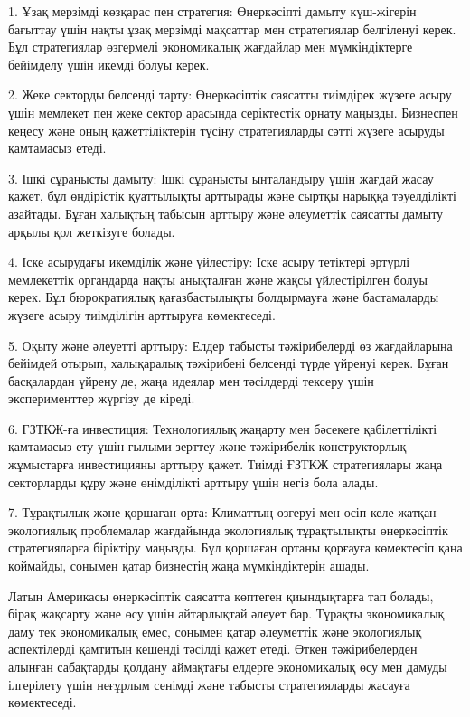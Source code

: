 \begin{multicols}{2}
1. Ұзақ мерзімді көзқарас пен стратегия: Өнеркәсіпті дамыту күш-жігерін
бағыттау үшін нақты ұзақ мерзімді мақсаттар мен стратегиялар белгіленуі
керек. Бұл стратегиялар өзгермелі экономикалық жағдайлар мен
мүмкіндіктерге бейімделу үшін икемді болуы керек.

2. Жеке секторды белсенді тарту: Өнеркәсіптік саясатты тиімдірек жүзеге
асыру үшін мемлекет пен жеке сектор арасында серіктестік орнату маңызды.
Бизнеспен кеңесу және оның қажеттіліктерін түсіну стратегияларды сәтті
жүзеге асыруды қамтамасыз етеді.

3. Ішкі сұранысты дамыту: Ішкі сұранысты ынталандыру үшін жағдай жасау
қажет, бұл өндірістік қуаттылықты арттырады және сыртқы нарыққа
тәуелділікті азайтады. Бұған халықтың табысын арттыру және әлеуметтік
саясатты дамыту арқылы қол жеткізуге болады.

4. Іске асырудағы икемділік және үйлестіру: Іске асыру тетіктері әртүрлі
мемлекеттік органдарда нақты анықталған және жақсы үйлестірілген болуы
керек. Бұл бюрократиялық қағазбастылықты болдырмауға және бастамаларды
жүзеге асыру тиімділігін арттыруға көмектеседі.

5. Оқыту және әлеуетті арттыру: Елдер табысты тәжірибелерді өз
жағдайларына бейімдей отырып, халықаралық тәжірибені белсенді түрде
үйренуі керек. Бұған басқалардан үйрену де, жаңа идеялар мен тәсілдерді
тексеру үшін эксперименттер жүргізу де кіреді.

6. ҒЗТКЖ-ға инвестиция: Технологиялық жаңарту мен бәсекеге
қабілеттілікті қамтамасыз ету үшін ғылыми-зерттеу және
тәжірибелік-конструкторлық жұмыстарға инвестицияны арттыру қажет. Тиімді
ҒЗТКЖ стратегиялары жаңа секторларды құру және өнімділікті арттыру үшін
негіз бола алады.

7. Тұрақтылық және қоршаған орта: Климаттың өзгеруі мен өсіп келе жатқан
экологиялық проблемалар жағдайында экологиялық тұрақтылықты өнеркәсіптік
стратегияларға біріктіру маңызды. Бұл қоршаған ортаны қорғауға
көмектесіп қана қоймайды, сонымен қатар бизнестің жаңа мүмкіндіктерін
ашады.

Латын Америкасы өнеркәсіптік саясатта көптеген қиындықтарға тап болады,
бірақ жақсарту және өсу үшін айтарлықтай әлеует бар. Тұрақты
экономикалық даму тек экономикалық емес, сонымен қатар әлеуметтік және
экологиялық аспектілерді қамтитын кешенді тәсілді қажет етеді. Өткен
тәжірибелерден алынған сабақтарды қолдану аймақтағы елдерге экономикалық
өсу мен дамуды ілгерілету үшін неғұрлым сенімді және табысты
стратегияларды жасауға көмектеседі.


\end{multicols}
